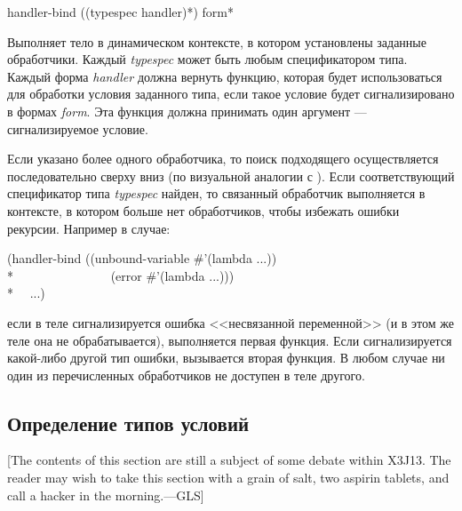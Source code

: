 \begin{defmac}
handler-bind ({(typespec handler)}*) {form}*

Выполняет тело в динамическом контексте, в котором установлены заданные
обработчики. Каждый \emph{typespec} может быть любым спецификатором типа. Каждый
форма \emph{handler} должна вернуть функцию, которая будет использоваться
для обработки условия заданного типа, если такое условие будет сигнализировано в
формах \emph{form}. Эта функция должна принимать один аргумент ---
сигнализируемое условие.

Если указано более одного обработчика, то поиск подходящего осуществляется
последовательно сверху вниз (по визуальной аналогии с ). Если
соответствующий спецификатор типа \emph{typespec} найден, то связанный
обработчик выполняется в контексте, в котором больше нет обработчиков, чтобы
избежать ошибки рекурсии. Например в случае:
\begin{lisp}
(handler-bind ((unbound-variable \#'(lambda ...)) \\*
~~~~~~~~~~~~~~~(error \#'(lambda ...))) \\*
~~...)
\end{lisp}
если в теле сигнализируется ошибка <<несвязанной переменной>> (и в этом же теле
она не обрабатывается), выполняется первая функция. Если сигнализируется
какой-либо другой тип ошибки, вызывается вторая функция. В любом случае ни один
из перечисленных обработчиков не доступен в теле другого.
\end{defmac}

\subsection{Определение типов условий}

[The contents of this section are still a subject of some debate within X3J13.
The reader may wish to take this section with a grain of salt, two aspirin
tablets, and call a hacker in the morning.---GLS]

